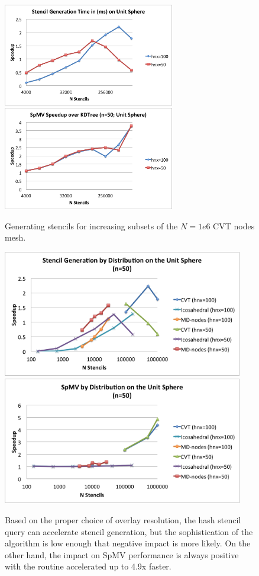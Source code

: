 \documentclass{report}
\begin{document}
\begin{figure}
\centering
\includegraphics[width=7.5cm]{../figures/stencils/sphere_subsets_1m_stencil_gen_speedup.png}
\includegraphics[width=7.5cm]{../figures/stencils/sphere_subsets_1m_spmv_speedup.png}
\caption{Generating stencils for increasing subsets of the $N=1e6$ CVT nodes mesh.}
\label{fig:hash_results}
\end{figure}
\begin{figure}
\centering
\includegraphics[width=10.5cm]{../figures/stencils/sphere_stencil_gen_speedup.png}
\includegraphics[width=10.5cm]{../figures/stencils/sphere_spmv_speedup.png} 
\caption{Based on the proper choice of overlay resolution, the hash stencil query can accelerate stencil generation, but the sophistication of the algorithm is low enough that negative impact is more likely. On the other hand, the impact on SpMV performance is always positive with the routine accelerated up to 4.9x faster.}
\label{fig:hash_results}
\end{figure}
\end{document}
